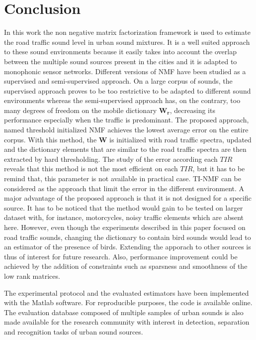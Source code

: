 \documentclass[twocolumn]{svjour3}          %
\begin{document}
\section{Conclusion}

In this work the non negative matrix factorization framework is used to estimate the road traffic sound level in urban sound mixtures. It is a well suited approach to these sound environments because it easily takes into account the overlap between the multiple sound sources present in the cities and it is adapted to monophonic sensor networks. Different versions of NMF have been studied as a supervised and semi-supervised approach. On a large corpus of sounds, the supervised approach proves to be too restrictive to be adapted to different sound environments whereas the semi-supervised approach has, on the contrary, too many degrees of freedom on the mobile dictionary $\mathbf{W_r}$, decreasing its performance especially when the traffic is predominant. The proposed approach, named threshold initialized NMF achieves the lowest average error on the entire corpus. With this method, the $\mathbf{W}$ is initialized with road traffic spectra, updated and the dictionary elements that are similar to the road traffic spectra are then extracted by hard thresholding.
The study of the error according each $TIR$ reveals that this method is not the most efficient on each $TIR$, but it has to be remind that, this parameter is not available in practical case. TI-NMF can be considered as the approach that limit the error in the different environment.
A major advantage of the proposed approach is that it is not designed for a specific source. It has to be noticed that the method would gain to be tested on larger dataset with, for instance, motorcycles, noisy traffic elements which are absent here. However, even though the experiments described in this paper focused on road traffic sounds, changing the dictionary to contain bird sounds would lead to an estimator of the presence of birds. Extending the apporach to other sources is thus of interest for future research. Also, performance improvement could be achieved by the addition of constraints such as sparsness \cite{hoyer2004non} and smoothness \cite{virtanen_monaural_2007} of the low rank matrices.

The experimental protocol and the evaluated estimators have been implemented with the Matlab software. For reproducible purposes, the code is available online. The evaluation database composed of multiple samples of urban sounds is also made available for the research community with interest in detection, separation and recognition tasks of urban sound sources.
\end{document}
